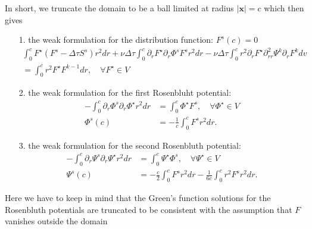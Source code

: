 \documentclass[reprint]{revtex4}
\begin{document}
In short, we truncate the domain to be a ball limited at radius $\mid\bm{x}\mid = c$ which then gives
\begin{itemize}
\item[1.] the weak formulation for the distribution function: $F^s(c)=0$
\begin{multline}
\int_0^cF^{\star}(F^s-\Delta\tau S^s)r^2dr+\nu\Delta\tau\int_0^c\partial_rF^{\star}\partial_r\Phi^s F^sr^2dr-\nu\Delta\tau\int_0^cr^2\partial_rF^{\star}\partial^2_{rr}\Psi^k\partial_rF^kdv
\\=\int_0^cr^2F^{\star}F^{k-1}dr, \quad \forall F^{\star}\in V
\end{multline}
\item[2.] the weak formulation for the first Rosenbluht potential:
\begin{align}
-\int_0^c\partial_r\Phi^s\partial_r\Phi^{\star}r^2dr&=\int_0^c\Phi^{\star}F^s, \quad \forall \Phi^{\star}\in V\\
\Phi^s(c)&=-\frac{1}{c}\int_0^c F^sr^2 dr.
\end{align}
\item[3.] the weak formulation for the second Rosenbluth potential:
\begin{align}
-\int_0^c\partial_r\Psi^s\partial_r\Psi^{\star}r^2dr&=\int_0^c\Psi^{\star}\Phi^s, \quad \forall \Psi^{\star}\in V\\
\Psi^s(c)&=-\frac{c}{2}\int_0^c  F^s r^2dr-\frac{1}{6c}\int_0^c r^2 F^s r^2dr.
\end{align}
\end{itemize}
Here we have to keep in mind that the Green's function solutions for the Rosenbluth potentials are truncated to be consistent with the assumption that $F$ vanishes outside the domain 
\end{document}
